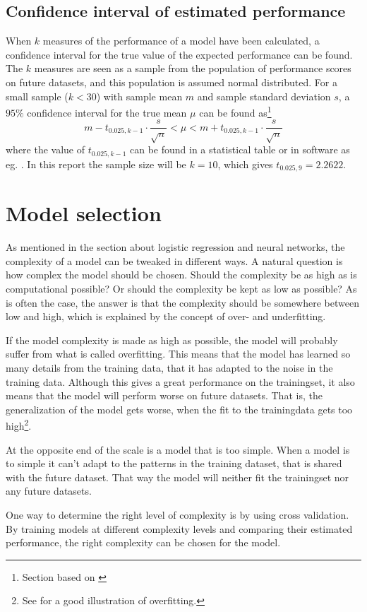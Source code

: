 \subsection{Confidence interval of estimated performance}\label{sec:statistics-on-performance}
When $k$ measures of the performance of a model have been calculated, a confidence interval for the true value of the expected performance can be found. The $k$ measures are seen as a sample from the population of performance scores on future datasets, and this population is assumed normal distributed. For a small sample ($k<30$) with sample mean $m$ and sample standard deviation $s$, a $95\%$ confidence interval for the true mean $\mu$ can be found as\footnote{Section based on \citet[p.232-233]{johnson05}}
\[
    m-t_{0.025,k-1}\cdot\frac{s}{\sqrt{n}} < \mu < m+t_{0.025,k-1}\cdot\frac{s}{\sqrt{n}}
\]
where the value of $t_{0.025,k-1}$ can be found in a statistical table or in software as eg. . In this report the sample size will be $k=10$, which gives $t_{0.025,9}=2.2622$.

\section{Model selection}
As mentioned in the section about logistic regression and neural networks, the complexity of a model can be tweaked in different ways. A natural question is how complex the model should be chosen. Should the complexity be as high as is computational possible? Or should the complexity be kept as low as possible? As is often the case, the answer is that the complexity should be somewhere between low and high, which is explained by the concept of over- and underfitting. \par
If the model complexity is made as high as possible, the model will probably suffer from what is called overfitting. This means that the model has learned so many details from the training data, that it has adapted to the noise in the training data. Although this gives a great performance on the trainingset, it also means that the model will perform worse on future datasets. That is, the generalization of the model gets worse, when the fit to the trainingdata gets too high\footnote{See \citet[p.220]{hastie09} for a good illustration of overfitting.}. \par
At the opposite end of the scale is a model that is too simple. When a model is to simple it can't adapt to the patterns in the training dataset, that is shared with the future dataset. That way the model will neither fit the trainingset nor any future datasets. \par
One way to determine the right level of complexity is by using cross validation. By training models at different complexity levels and comparing their estimated performance, the right complexity can be chosen for the model.

